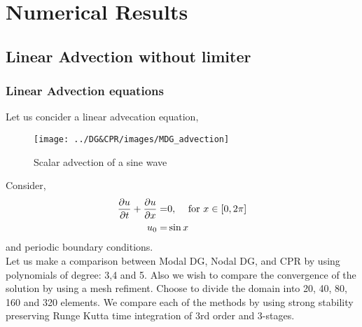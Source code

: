 \section{Numerical Results}
\subsection{Linear Advection without limiter}

\begin{frame} \frametitle{Linear Advection equations}
	Let us concider a linear advecation equation,
	\begin{figure}
		\centering
		\texttt{[image: ../DG\&CPR/images/MDG\_advection]}
		\caption{Scalar advection of a sine wave}
		\label{fig:LinearAdvection}
	\end{figure}
\end{frame}

\begin{frame}
	Consider,
	\begin{align}
		\frac{\partial u}{\partial t} + \frac{\partial u}{\partial x} =& 0, \;\;\; \text{ for } x\in[0,2\pi] \\
		u_0 =& \sin x
	\end{align}
	and periodic boundary conditions. \\
	Let us make a comparison between Modal DG, Nodal DG, and CPR by using polynomials of degree: 3,4 and 5.
	Also we wish to compare the convergence of the solution by using a mesh refiment. Choose to divide the domain into 20, 40, 80, 160 and 320 elements. We compare each of the methods by using strong stability preserving Runge Kutta time integration of 3rd order and 3-stages.
\end{frame}

